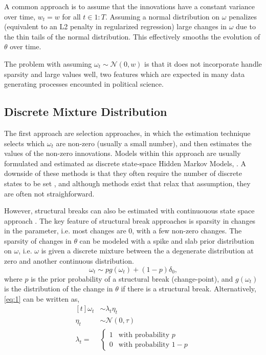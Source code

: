 \documentclass{article}
\newcommand{\paren}[1]{\ensuremath{\left(#1\right)}}
\newcommand{\dnorm}[1]{\ensuremath{\mathcal{N}\paren{#1}}}
\begin{document}
A common approach is to assume that the innovations have a constant variance over time, $w_{t} = w$  for all $t \in 1:T$.
Assuming a normal distribution on $\omega$ penalizes (equivalent to an L2 penalty in regularized regression) large changes in $\omega$ due to the thin tails of the normal distribution.
This effectively smooths the evolution of $\theta$ over time.

The problem with assuming $\omega_{t} \sim \dnorm{0, w}$ is that it does not incorporate handle sparsity and large values well, two features which are expected in many data generating processes encounted in political science.

\subsection{Discrete Mixture Distribution}
\label{sec:discr-mixt-distr}

The first approach are selection approaches, in which the estimation technique selects which $\omega_{t}$ are non-zero (usually a small number), and then estimates the values of the non-zero innovations.
Models within this approach are usually formulated and estimated as discrete state-space Hidden Markov Models, \parencites{Chib1998}{spirling2007bayesian}{Park2011}{Park2010}{Blackwell2012}.
A downside of these methods is that they often require the number of discrete states to be set \parencite{Chib1998}, and although methods exist that relax that assumption, they are often not straighforward.

However, structural breaks can also be estimated with continuouous state space approach \parencite{GiordaniKohn2008}.
The key feature of structural break approaches is sparsity in changes in the parameter, i.e. most changes are 0, with a few non-zero changes.
The sparsity of changes in $\theta$ can be modeled with a spike and slab prior distribution on $\omega$,
i.e. $\omega$ is given a discrete mixture between the a degenerate distribution at zero and another continuous distribution.
\begin{equation}
  \label{eq:1}
  \omega_{t} \sim p g(\omega_{t}) + (1 - p) \delta_{0} \text{,}
\end{equation}
where $p$ is the prior probability of a structural break (change-point), and $g(\omega_{t})$ is the distribution of the change in $\theta$ if there is a structural break.
Alternatively, \eqref{eq:1} can be written as,
\begin{equation}
  \label{eq:7}
  \begin{aligned}[t]
    \omega_{t} & \sim \lambda_{t} \eta_{t} \\
    \eta_{t} & \sim \dnorm{0, \tau} \\
    \lambda_{t} = & 
    \begin{cases}
      1 & \text{with probability $p$} \\
      0 & \text{with probability $1 - p$}
    \end{cases}
  \end{aligned}
\end{equation}
\end{document}
